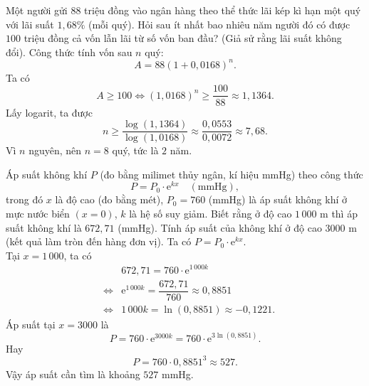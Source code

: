 \begin{ex}%
	Một người gửi $88$ triệu đồng vào ngân hàng theo thể thức lãi kép kì hạn một quý với lãi suất $1{,}68\%$ (mỗi quý). Hỏi sau ít nhất bao nhiêu năm người đó có được $100$ triệu đồng cả vốn lẫn lãi từ số vốn ban đầu? (Giả sử rằng lãi suất không đổi).
	\loigiai
	{
		Công thức tính vốn sau $n$ quý:
		\[
		A=88\left(1+0{,}0168\right)^n.
		\]
		Ta có
		\[
		A\geq100\Leftrightarrow(1{,}0168)^n\geq\dfrac{100}{88}\approx1{,}1364.
		\]
		Lấy logarit, ta được
		\[
		n\geq\dfrac{\log(1{,}1364)}{\log(1{,}0168)}\approx\dfrac{0{,}0553}{0{,}0072}\approx7{,}68.
		\]
		Vì $n$ nguyên, nên $n=8$ quý, tức là $2$ năm.
	}
\end{ex}

\begin{ex}%
	Áp suất không khí $P$ (đo bằng milimet thủy ngân, kí hiệu mmHg) theo công thức
	\[
	P = P_0 \cdot \mathrm{e}^{kx} \quad (\text{mmHg}),
	\]
	trong đó $x$ là độ cao (đo bằng mét), $P_0=760$ (mmHg) là áp suất không khí ở mực nước biển $(x=0)$, $k$ là hệ số suy giảm. Biết rằng ở độ cao $1\,000$ m thì áp suất không khí là $672{,}71$ (mmHg). Tính áp suất của không khí ở độ cao $3000$ m (kết quả làm tròn đến hàng đơn vị).
	\loigiai
	{
		Ta có $P = P_0 \cdot \mathrm{e}^{kx}$.\\
		Tại $x=1\,000$, ta có 
		\begin{eqnarray*}
			&&672{,}71 = 760\cdot \mathrm{e}^{1\,000k}\\
			&\Leftrightarrow&\mathrm{e}^{1\,000k} = \dfrac{672{,}71}{760} \approx 0{,}8851\\
			&\Leftrightarrow&1\,000k = \ln(0{,}8851) \approx -0{,}1221.
		\end{eqnarray*}
		Áp suất tại $x=3000$ là
		\[
		P = 760\cdot \mathrm{e}^{3000k}=760\cdot \mathrm{e}^{3\ln (0{,}8851)}.
		\]
		Hay
		\[
		P= 760\cdot 0{,}8851^3\approx 527.
		\]
		Vậy áp suất cần tìm là khoảng $527$ mmHg.
	}
\end{ex}

